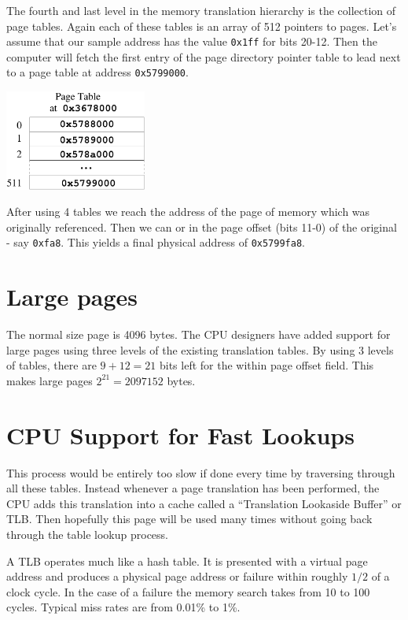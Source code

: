 \documentclass[11pt,b5paper]{book}
\begin{document}
The fourth and last level in the memory translation hierarchy is the collection
of page tables.
Again each of these tables is an array of 512 pointers to pages.
Let's assume that our sample address has the value {\tt 0x1ff} for bits
20-12.
Then the computer will fetch the first entry of the page directory pointer
table to lead next to a page table at address {\tt 0x5799000}.
\begin{center}
\includegraphics[width=0.35\textwidth]{ptable.pdf}
\end{center}  

After using 4 tables we reach the address of the page of memory which was
originally referenced.
Then we can or in the page offset (bits 11-0) of the original - say {\tt 0xfa8}.
This yields a final physical address of {\tt 0x5799fa8}.

\section{Large pages}

The normal size page is 4096 bytes. 
The CPU designers have added support for large pages using three levels of
the existing translation tables.
By using 3 levels of tables, there are $9+12=21$ bits left for the within page
offset field.
This makes large pages $2^{21}= 2097152$ bytes.

\section{CPU Support for Fast Lookups}

This process would be entirely too slow if done every time by traversing through
all these tables.  
Instead whenever a page translation has been performed, the CPU adds this translation into a cache called a ``Translation Lookaside Buffer'' or TLB.
Then hopefully this page will be used many times without going back through the
table lookup process.

A TLB operates much like a hash table.
It is presented with a virtual page address and produces a physical page address
or failure within roughly $1/2$ of a clock cycle.
In the case of a failure the memory search takes from 10 to 100 cycles.
Typical miss rates are from 0.01\% to 1\%.
\end{document}
